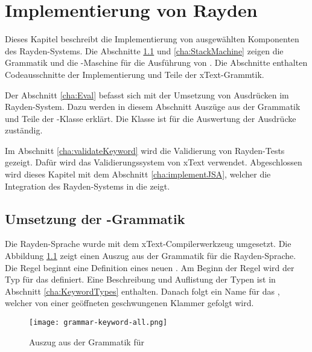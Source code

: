 \chapter{Implementierung von Rayden}
\label{cha:Implementierung}

Dieses Kapitel beschreibt die Implementierung von ausgewählten Komponenten des Rayden-Systems. Die Abschnitte \ref{cha:KeywordGrammar} und \ref{cha:StackMachine} zeigen die Grammatik und die -Maschine für die Ausführung von . Die Abschnitte enthalten Codeausschnitte der Implementierung und Teile der xText-Grammtik.

\SuperPar
Der Abschnitt \ref{cha:Eval} befasst sich mit der Umsetzung von Ausdrücken im Rayden-System. Dazu werden in diesem Abschnitt Auszüge aus der Grammatik und Teile der -Klasse erklärt. Die Klasse  ist für die Auswertung der Ausdrücke zuständig. 

\SuperPar
Im Abschnitt \ref{cha:validateKeyword} wird die Validierung von Rayden-Tests gezeigt. Dafür wird das Validierungssystem von xText verwendet. Abgeschlossen wird dieses Kapitel mit dem Abschnitt \ref{cha:implementJSA}, welcher die Integration des Rayden-Systems in die  zeigt. 


\section{Umsetzung der -Grammatik}
\label{cha:KeywordGrammar}

Die Rayden-Sprache wurde mit dem xText-Compilerwerkzeug umgesetzt. Die Abbildung \ref{fig:keywordGrammar} zeigt einen Auszug aus der Grammatik für die Rayden-Sprache. Die Regel  beginnt eine Definition eines neuen . Am Beginn der Regel wird der Typ für das  definiert. Eine Beschreibung und Auflistung der Typen ist in Abschnitt \ref{cha:KeywordTypes} enthalten. Danach folgt ein Name für das , welcher von einer geöffneten geschwungenen Klammer gefolgt wird.

\begin{figure}
\centering
\texttt{[image: grammar-keyword-all.png]}
\caption{Auszug aus der Grammatik für }
\label{fig:keywordGrammar}
\end{figure}

